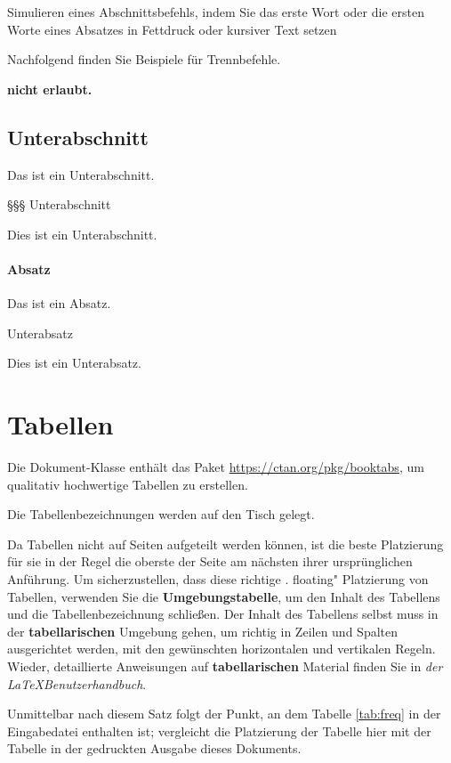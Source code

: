 \documentclass[manuscript,screen,review]{acmart}
\begin{document}
Simulieren eines Abschnittsbefehls, indem Sie das erste Wort oder die ersten Worte eines Absatzes in Fettdruck oder kursiver Text setzen

Nachfolgend finden Sie Beispiele für Trennbefehle.

{\bfseries nicht erlaubt.}\subsection{Unterabschnitt}
\label{sec:subsection}

Das ist ein Unterabschnitt.

§§§ Unterabschnitt

\label{sec:subsubsection}

Dies ist ein Unterabschnitt.

\paragraph{Absatz}

Das ist ein Absatz.

Unterabsatz

Dies ist ein Unterabsatz.

\section{Tabellen}

Die Dokument-Klasse enthält das Paket \url{https://ctan.org/pkg/booktabs}, um qualitativ hochwertige Tabellen zu erstellen.

Die Tabellenbezeichnungen werden auf den Tisch gelegt.

Da Tabellen nicht auf Seiten aufgeteilt werden können, ist die beste Platzierung für sie in der Regel die oberste der Seite am nächsten ihrer ursprünglichen Anführung. Um sicherzustellen, dass diese richtige     . floating" Platzierung von Tabellen, verwenden Sie die \textbf{Umgebungstabelle}, um den Inhalt des Tabellens und die Tabellenbezeichnung schließen. Der Inhalt des Tabellens selbst muss in der \textbf{tabellarischen} Umgebung gehen, um richtig in Zeilen und Spalten ausgerichtet werden, mit den gewünschten horizontalen und vertikalen Regeln. Wieder, detaillierte Anweisungen auf \textbf{tabellarischen} Material finden Sie in \textit{der \LaTeX Benutzerhandbuch}.

Unmittelbar nach diesem Satz folgt der Punkt, an dem Tabelle \ref{tab:freq} in der Eingabedatei enthalten ist; vergleicht die Platzierung der Tabelle hier mit der Tabelle in der gedruckten Ausgabe dieses Dokuments.
\end{document}
